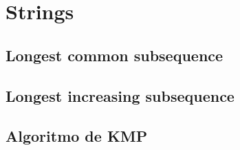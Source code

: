 \documentclass[10pt,letterpaper,twocolumn]{article}
\begin{document}
	
\section{Strings}
	\subsection{Longest common subsequence}
	
	\subsection{Longest increasing subsequence}
	
	\subsection{Algoritmo de KMP}
	
	
\end{document}
